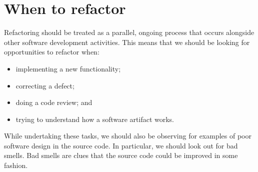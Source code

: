 \documentclass[a4paper, openany]{memoir}
\begin{document}
\section{When to refactor}
Refactoring should be treated as a parallel, ongoing process that occurs alongside other software development activities. This means that we should be looking for opportunities to refactor when:
\begin{itemize}
    \item implementing a new functionality;
    \item correcting a defect;
    \item doing a code review; and
    \item trying to understand how a software artifact works.
\end{itemize}
While undertaking these tasks, we should also be observing for examples of poor software design in the source code. In particular, we should look out for bad smells. Bad smells are clues that the source code could be improved in some fashion.
\end{document}
